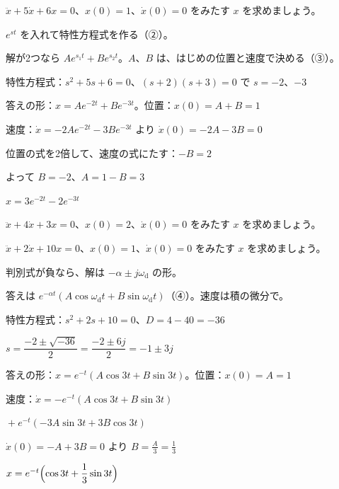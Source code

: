 \begin{reidai}[解が2つのとき]
$\ddot x+5\dot x+6x=0$、$x(0)=1$、$\dot x(0)=0$ をみたす $x$ を求めましょう。\par
\kangaekata $e^{st}$ を入れて特性方程式を作る（②）。\par
\bkvimq 解が2つなら $Ae^{s_1t}+Be^{s_2t}$。$A$、$B$ は、はじめの位置と速度で決める（③）。\par
\shiki 特性方程式：$s^2+5s+6=0$、$(s+2)(s+3)=0$ で $s=-2$、$-3$\par
\bkvimq 答えの形：$x=Ae^{-2t}+Be^{-3t}$。位置：$x(0)=A+B=1$\par
\bkvimq 速度：$\dot x=-2Ae^{-2t}-3Be^{-3t}$ より $\dot x(0)=-2A-3B=0$\par
\bkvimq 位置の式を2倍して、速度の式にたす：$-B=2$\par
\bkvimq よって $B=-2$、$A=1-B=3$\par
\kotae $x=3e^{-2t}-2e^{-3t}$
\end{reidai}

\begin{jibun}
$\ddot x+4\dot x+3x=0$、$x(0)=2$、$\dot x(0)=0$ をみたす $x$ を求めましょう。
\end{jibun}

\begin{reidai}[解が複素数のとき]
$\ddot x+2\dot x+10x=0$、$x(0)=1$、$\dot x(0)=0$ をみたす $x$ を求めましょう。\par
\kangaekata 判別式が負なら、解は $-\alpha\pm j\omega_{\mathrm d}$ の形。\par
\bkvimq 答えは $e^{-\alpha t}(A\cos\omega_{\mathrm d}t+B\sin\omega_{\mathrm d}t)$（④）。速度は積の微分で。\par
\shiki 特性方程式：$s^2+2s+10=0$、$D=4-40=-36$\par
\bkvimq $s=\dfrac{-2\pm\sqrt{-36}}{2}=\dfrac{-2\pm6j}{2}=-1\pm3j$\par
\bkvimq 答えの形：$x=e^{-t}(A\cos3t+B\sin3t)$。位置：$x(0)=A=1$\par
\bkvimq 速度：$\dot x=-e^{-t}(A\cos3t+B\sin3t)$\par
\bkvimq \phantom{速度：$\dot x$}${}+e^{-t}(-3A\sin3t+3B\cos3t)$\par
\bkvimq $\dot x(0)=-A+3B=0$ より $B=\frac A3=\frac13$\par
\kotae $x=e^{-t}\Bigl(\cos3t+\dfrac13\sin3t\Bigr)$
\end{reidai}

